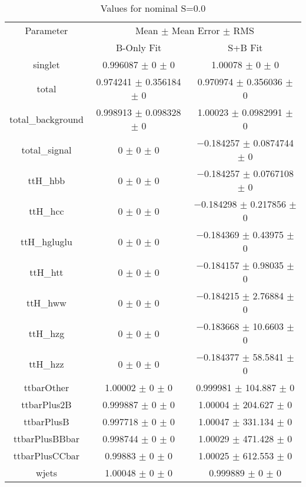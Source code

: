 \begin{table}
\centering
\caption{Values for nominal S=0.0}
\begin{tabular}{ccc}
\toprule
Parameter & \multicolumn{2}{c}{Mean $\pm$ Mean Error $\pm$ RMS}\\
 & B-Only Fit & S+B Fit\\
\midrule
singlet & \num{0.996087} $\pm$ \num{0} $\pm$ \num{0} & \num{1.00078} $\pm$ \num{0} $\pm$ \num{0}\\
total & \num{0.974241} $\pm$ \num{0.356184} $\pm$ \num{0} & \num{0.970974} $\pm$ \num{0.356036} $\pm$ \num{0}\\
total\_background & \num{0.998913} $\pm$ \num{0.098328} $\pm$ \num{0} & \num{1.00023} $\pm$ \num{0.0982991} $\pm$ \num{0}\\
total\_signal & \num{0} $\pm$ \num{0} $\pm$ \num{0} & \num{-0.184257} $\pm$ \num{0.0874744} $\pm$ \num{0}\\
ttH\_hbb & \num{0} $\pm$ \num{0} $\pm$ \num{0} & \num{-0.184257} $\pm$ \num{0.0767108} $\pm$ \num{0}\\
ttH\_hcc & \num{0} $\pm$ \num{0} $\pm$ \num{0} & \num{-0.184298} $\pm$ \num{0.217856} $\pm$ \num{0}\\
ttH\_hgluglu & \num{0} $\pm$ \num{0} $\pm$ \num{0} & \num{-0.184369} $\pm$ \num{0.43975} $\pm$ \num{0}\\
ttH\_htt & \num{0} $\pm$ \num{0} $\pm$ \num{0} & \num{-0.184157} $\pm$ \num{0.98035} $\pm$ \num{0}\\
ttH\_hww & \num{0} $\pm$ \num{0} $\pm$ \num{0} & \num{-0.184215} $\pm$ \num{2.76884} $\pm$ \num{0}\\
ttH\_hzg & \num{0} $\pm$ \num{0} $\pm$ \num{0} & \num{-0.183668} $\pm$ \num{10.6603} $\pm$ \num{0}\\
ttH\_hzz & \num{0} $\pm$ \num{0} $\pm$ \num{0} & \num{-0.184377} $\pm$ \num{58.5841} $\pm$ \num{0}\\
ttbarOther & \num{1.00002} $\pm$ \num{0} $\pm$ \num{0} & \num{0.999981} $\pm$ \num{104.887} $\pm$ \num{0}\\
ttbarPlus2B & \num{0.999887} $\pm$ \num{0} $\pm$ \num{0} & \num{1.00004} $\pm$ \num{204.627} $\pm$ \num{0}\\
ttbarPlusB & \num{0.997718} $\pm$ \num{0} $\pm$ \num{0} & \num{1.00047} $\pm$ \num{331.134} $\pm$ \num{0}\\
ttbarPlusBBbar & \num{0.998744} $\pm$ \num{0} $\pm$ \num{0} & \num{1.00029} $\pm$ \num{471.428} $\pm$ \num{0}\\
ttbarPlusCCbar & \num{0.99883} $\pm$ \num{0} $\pm$ \num{0} & \num{1.00025} $\pm$ \num{612.553} $\pm$ \num{0}\\
wjets & \num{1.00048} $\pm$ \num{0} $\pm$ \num{0} & \num{0.999889} $\pm$ \num{0} $\pm$ \num{0}\\
\bottomrule
\end{tabular}
\end{table}